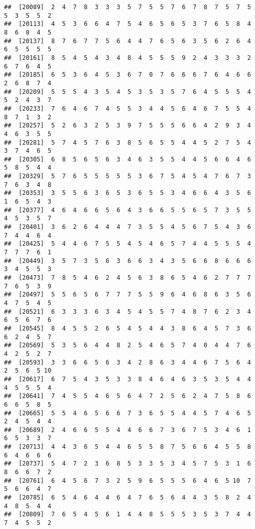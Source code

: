 \documentclass[
]{book}
\begin{document}
\begin{verbatim}
##  [20089]  2  4  7  8  3  3  3  5  7  5  5  7  6  7  8  7  5  7  5  5  3  5  5  2
##  [20113]  4  5  3  6  6  4  7  5  4  6  5  6  5  3  7  6  5  8  4  8  6  8  4  5
##  [20137]  8  7  6  7  7  5  6  4  4  7  6  5  6  3  5  6  2  6  4  6  5  5  5  5
##  [20161]  8  5  4  5  4  3  4  8  4  5  5  5  9  2  4  3  3  3  2  6  7  6  4  5
##  [20185]  6  5  3  6  4  5  3  6  7  0  7  6  6  6  7  6  4  6  6  2  6  8  7  4
##  [20209]  5  5  5  4  3  5  4  5  3  5  3  5  7  6  4  5  5  5  4  5  2  4  3  7
##  [20233]  7  6  4  6  7  4  5  5  3  4  4  5  6  4  6  7  5  5  4  8  7  1  3  2
##  [20257]  5  2  6  3  2  5  3  9  7  5  5  5  6  6  4  2  9  3  4  4  6  3  5  5
##  [20281]  5  7  4  5  7  6  3  8  5  6  5  5  4  4  5  2  7  5  4  3  7  4  6  5
##  [20305]  6  8  5  6  5  6  3  4  6  3  5  5  4  4  5  6  6  4  6  5  8  5  4  4
##  [20329]  5  7  6  5  5  5  5  5  3  6  7  5  4  5  4  7  6  7  3  7  6  3  4  8
##  [20353]  3  5  5  6  3  6  5  3  6  5  5  3  4  6  6  4  3  5  6  1  6  5  4  3
##  [20377]  4  6  4  6  6  5  6  4  3  6  6  5  5  6  5  7  3  5  5  4  5  3  5  7
##  [20401]  3  6  2  6  4  4  4  7  3  5  5  4  5  6  7  5  4  3  6  7  4  4  6  4
##  [20425]  5  4  4  6  7  5  5  4  5  4  6  5  7  4  4  5  5  5  4  7  7  7  6  1
##  [20449]  3  5  7  3  5  6  3  6  6  3  4  3  5  6  6  8  6  6  6  3  4  5  5  3
##  [20473]  7  8  5  4  6  2  4  5  6  3  8  6  5  4  6  2  7  7  7  7  6  5  3  9
##  [20497]  5  5  6  5  6  7  7  7  5  5  9  6  4  6  8  6  3  5  6  4  7  5  4  5
##  [20521]  6  3  3  3  6  3  4  5  4  5  5  7  4  8  7  6  2  3  4  6  5  6  7  6
##  [20545]  8  4  5  5  2  6  5  4  5  4  4  3  8  6  4  5  7  3  6  6  2  4  5  7
##  [20569]  5  3  5  6  4  4  8  2  5  4  6  5  7  4  0  4  4  7  6  4  2  5  2  7
##  [20593]  3  3  6  6  5  6  3  4  2  8  6  3  4  4  6  7  5  6  4  2  5  6  5 10
##  [20617]  6  7  5  4  3  5  3  3  8  4  6  4  6  3  5  3  5  4  4  4  5  5  5  4
##  [20641]  7  4  5  5  4  6  5  6  4  7  2  5  6  2  4  7  5  8  6  6  6  5  8  5
##  [20665]  5  5  4  6  5  6  6  7  3  6  5  5  4  4  5  7  4  6  5  2  4  5  4  4
##  [20689]  2  4  6  6  5  5  4  4  6  6  7  3  6  7  5  3  4  6  1  6  5  3  3  7
##  [20713]  4  4  3  6  5  4  4  6  5  5  8  7  5  6  6  4  5  5  8  6  4  6  6  6
##  [20737]  5  4  7  2  3  6  8  5  3  3  5  3  4  5  7  5  3  1  6  8  6  6  7  2
##  [20761]  6  4  5  6  7  3  2  5  9  6  5  5  5  6  4  6  5 10  7  5  6  6  4  7
##  [20785]  6  5  4  6  4  4  6  4  7  6  5  6  4  4  3  5  8  2  4  4  8  5  4  4
##  [20809]  7  6  5  4  5  6  1  4  4  8  5  5  5  3  5  3  7  4  4  7  4  5  5  2

\end{verbatim}
\end{document}
